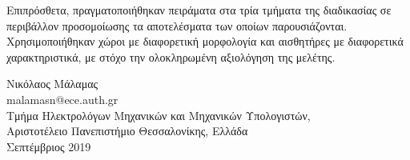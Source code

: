 Επιπρόσθετα, πραγματοποιήθηκαν πειράματα στα τρία τμήματα της διαδικασίας σε περιβάλλον προσομοίωσης τα αποτελέσματα των οποίων παρουσιάζονται. Χρησιμοποιήθηκαν χώροι με διαφορετική μορφολογία και αισθητήρες με διαφορετικά χαρακτηριστικά, με στόχο την ολοκληρωμένη αξιολόγηση της μελέτης.


\begin{flushright}
  \vspace{1.5cm}
  Νικόλαος Μάλαμας
  \\
  malamasn@ece.auth.gr
  \\
  Τμήμα Ηλεκτρολόγων Μηχανικών και Μηχανικών Υπολογιστών,
  \\
  Αριστοτέλειο Πανεπιστήμιο Θεσσαλονίκης, Ελλάδα
  \\
  Σεπτέμβριος 2019
\end{flushright}

